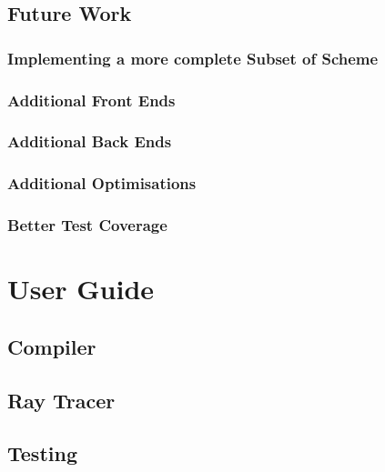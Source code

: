 \documentclass[11pt]{report}
\begin{document}
\section{Future Work}
\subsection{Implementing a more complete Subset of Scheme}
\subsection{Additional Front Ends}
\subsection{Additional Back Ends}
\subsection{Additional Optimisations}
\subsection{Better Test Coverage}

\chapter{User Guide}
\section{Compiler}
\section{Ray Tracer}
\section{Testing}

\newpage
\end{document}
